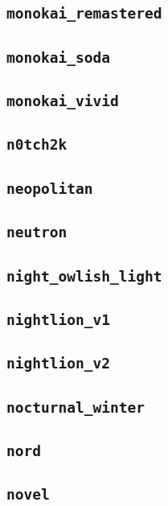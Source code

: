 \subsection{\texttt{monokai\_remastered}}
\newpage
\subsection{\texttt{monokai\_soda}}
\newpage
\subsection{\texttt{monokai\_vivid}}
\newpage
\subsection{\texttt{n0tch2k}}
\newpage
\subsection{\texttt{neopolitan}}
\newpage
\subsection{\texttt{neutron}}
\newpage
\subsection{\texttt{night\_owlish\_light}}
\newpage
\subsection{\texttt{nightlion\_v1}}
\newpage
\subsection{\texttt{nightlion\_v2}}
\newpage
\subsection{\texttt{nocturnal\_winter}}
\newpage
\subsection{\texttt{nord}}
\newpage
\subsection{\texttt{novel}}
\newpage

